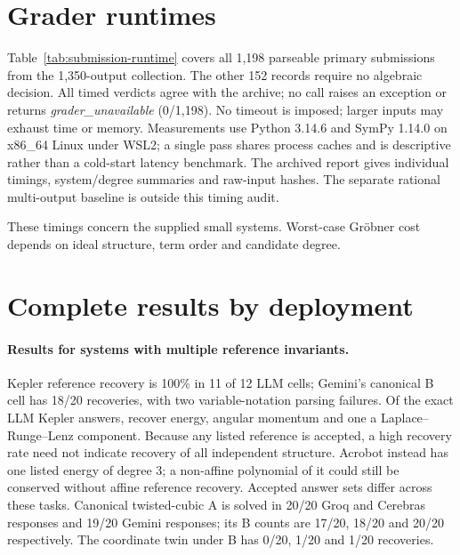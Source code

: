 \documentclass[10pt]{article}
\begin{document}
\section{Grader runtimes}\label{app:runtimes}

\begin{table}[!htbp]
\centering\small
\tabSubmissionRuntime
\caption{One sequential timed grade call per parseable primary submission, including decimal reconstruction at $D=1000$ and numerical diagnostics when needed. Input loading and trajectory/basis setup for the diagnostic are excluded; bases computed inside the grader are included. Degree is total submitted degree (maximum over curve generators).}
\label{tab:submission-runtime}
\end{table}

Table~\ref{tab:submission-runtime} covers all 1,198 parseable primary submissions from the 1,350-output collection. The other 152 records require no algebraic decision. All timed verdicts agree with the archive; no call raises an exception or returns \emph{grader\_unavailable} (0/1,198). No timeout is imposed; larger inputs may exhaust time or memory. Measurements use Python 3.14.6 and SymPy 1.14.0 on x86\_64 Linux under WSL2; a single pass shares process caches and is descriptive rather than a cold-start latency benchmark. The archived report gives individual timings, system/degree summaries and raw-input hashes. The separate rational multi-output baseline is outside this timing audit.

These timings concern the supplied small systems. Worst-case Gr\"obner cost depends on ideal structure, term order and candidate degree.

\section{Complete results by deployment}\label{app:deployments}

\paragraph{Results for systems with multiple reference invariants.} Kepler reference recovery is 100\% in 11 of 12 LLM cells; Gemini's canonical B cell has 18/20 recoveries, with two variable-notation parsing failures. Of the \nKepler{} exact LLM Kepler answers, \nKeplerEnergy{} recover energy, \nKeplerAngular{} angular momentum and one a Laplace--Runge--Lenz component. Because any listed reference is accepted, a high recovery rate need not indicate recovery of all independent structure. Acrobot instead has one listed energy of degree 3; a non-affine polynomial of it could still be conserved without affine reference recovery. Accepted answer sets differ across these tasks. Canonical twisted-cubic A is solved in 20/20 Groq and Cerebras responses and 19/20 Gemini responses; its B counts are 17/20, 18/20 and 20/20 respectively. The coordinate twin under B has 0/20, 1/20 and 1/20 recoveries.
\end{document}
